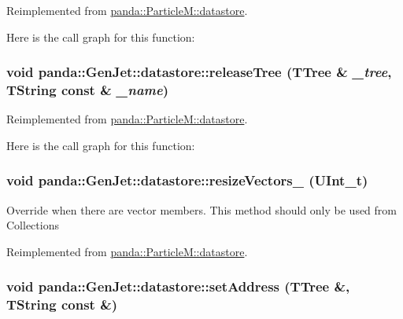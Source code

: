 Reimplemented from \hyperlink{structpanda_1_1ParticleM_1_1datastore_a4069b8cdca5715ed6faf0a7907ea8386}{panda::ParticleM::datastore}.

Here is the call graph for this function:\hypertarget{structpanda_1_1GenJet_1_1datastore_aea7b516e513fbdf5cc2c6f67d0ae3dba}{
\subsubsection[{releaseTree}]{\setlength{\rightskip}{0pt plus 5cm}void panda::GenJet::datastore::releaseTree (TTree \& {\em \_\-tree}, \/  TString const \& {\em \_\-name})}}
\label{structpanda_1_1GenJet_1_1datastore_aea7b516e513fbdf5cc2c6f67d0ae3dba}


Reimplemented from \hyperlink{structpanda_1_1ParticleM_1_1datastore_ad6986990fa55f1c6ca4e92db28486922}{panda::ParticleM::datastore}.

Here is the call graph for this function:\hypertarget{structpanda_1_1GenJet_1_1datastore_a6b6d0feb6fe978115c45180cccb7497b}{
\subsubsection[{resizeVectors\_\-}]{\setlength{\rightskip}{0pt plus 5cm}void panda::GenJet::datastore::resizeVectors\_\- (UInt\_\-t)}}
\label{structpanda_1_1GenJet_1_1datastore_a6b6d0feb6fe978115c45180cccb7497b}


Override when there are vector members. This method should only be used from Collections 

Reimplemented from \hyperlink{structpanda_1_1ParticleM_1_1datastore_a6dd61d4a8f70e81a1638757a5edbc7ed}{panda::ParticleM::datastore}.\hypertarget{structpanda_1_1GenJet_1_1datastore_a7afa28bd4468d7ecb3c4c086d46ee6cf}{
\subsubsection[{setAddress}]{\setlength{\rightskip}{0pt plus 5cm}void panda::GenJet::datastore::setAddress (TTree \&, \/  TString const \&)}}
\label{structpanda_1_1GenJet_1_1datastore_a7afa28bd4468d7ecb3c4c086d46ee6cf}


